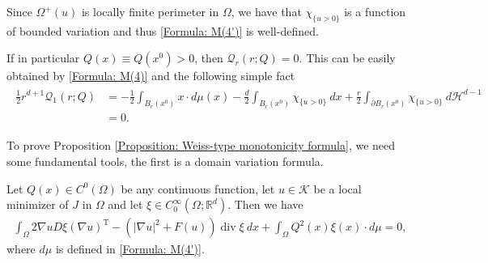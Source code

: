 \documentclass[11pt,reqno]{amsart}
\begin{document}
\begin{remark}
	Since $\varOmega^{+}(u)$ is locally finite perimeter in $\Omega$, we have that $\chi_{\{u>0\}}$ is a function of bounded variation and thus \eqref{Formula: M(4')} is well-defined.
\end{remark}
\begin{remark}\label{Remark: Q}
	If in particular $Q(x)\equiv Q(x^{0})>0$, then $\mathcal{Q}_{r}(r;Q)=0$. This can be easily obtained by \eqref{Formula: M(4)} and the following simple fact
	\begin{align}\label{Formula: M(9)}
	   \begin{alignedat}{2}
	       \frac{1}{2}r^{d+1}\mathcal{Q}_{1}(r;Q)&=-\frac{1}{2}\int_{B_{r}(x^{0})}x\cdot d\mu(x)-\frac{d}{2}\int_{B_{r}(x^{0})}\chi_{\{u>0\}}\:dx+\frac{r}{2}\int_{\partial B_{r}(x^{0})}\chi_{\{u>0\}}\:d\mathcal{H}^{d-1}\\
	       &=0.
	   \end{alignedat}
	\end{align}
\end{remark}
To prove Proposition \ref{Proposition: Weiss-type monotonicity formula}, we need some fundamental tools, the first is a domain variation formula.
\begin{lemma}\label{Lemma: Domain variation formula}
	Let $Q(x)\in C^{0}(\Omega)$ be any continuous function, let $u\in\mathcal{K}$ be a local minimizer of $J$ in $\Omega$ and let $\xi\in C_{0}^{\infty}(\Omega;\mathbb{R}^{d})$. Then we have
	\begin{align}\label{Formula: M(10)}
		\int_{\Omega}2\nabla uD\xi(\nabla u)^{\mathrm{T}}-(|\nabla u|^{2}+F(u))\operatorname{div}\xi\:dx+\int_{\Omega}Q^{2}(x)\xi(x)\cdot d\mu=0,
	\end{align}
	where $d\mu$ is defined in \eqref{Formula: M(4')}.
\end{lemma}
\end{document}
